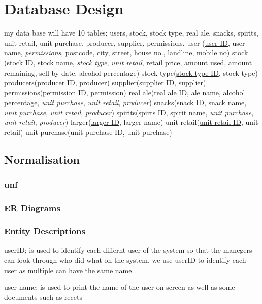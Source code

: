 \section{Database Design}

my data base will have 10 tables; users, stock, stock type, real ale, snacks, spirits, unit retail, unit purchase, producer, supplier, permissions.
user (\underline{user ID}, user name, \emph{permissions}, postcode, city, street, house no., landline, mobile no)
stock (\underline{stock ID}, stock name, \emph{stock type}, \emph{unit retail}, retail price, amount used, amount remaining, sell by date, alcohol percentage)
stock type(\underline{stock type ID}, stock type)
producers(\underline{producer ID}, producer)
supplier(\underline{supplier ID}, supplier)
permissions(\underline{permission ID}, permission)
real ale(\underline{real ale ID}, ale name, alcohol percentage, \emph{unit purchase}, \emph{unit retail}, \emph{producer})
snacks(\underline{snack ID}, snack name, \emph{unit purchase}, \emph{unit retail}, \emph{producer})
spirits(\underline{spirts ID}, spirit name, \emph{unit purchase}, \emph{unit retail}, \emph{producer})
larger(\underline{larger ID}, larger name)
unit retail(\underline{unit retail ID}, unit retail)
unit purchase(\underline{unit purchase ID}, unit purchase)

\subsection{Normalisation}

\subsubsection{unf}





\subsubsection{ER Diagrams}

\subsubsection{Entity Descriptions}

userID; is used to identify each differnt user of the system so that the manegers can look through who did what on the system, we use userID to identify each user as multiple can have the same name.

user name; is used to print the name of the user on screen as well as some documents such as recets

